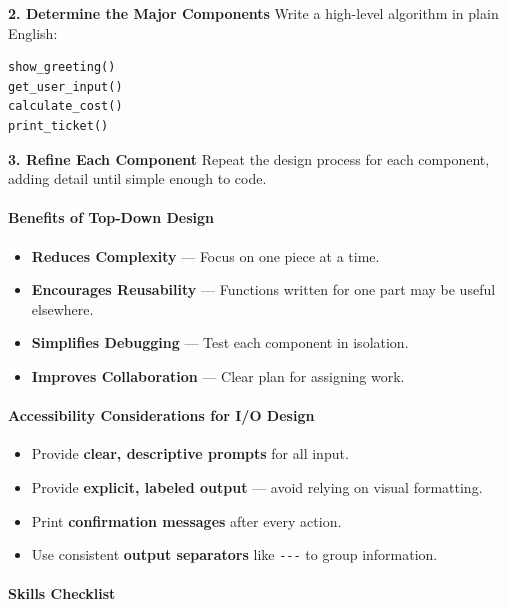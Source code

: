 \documentclass[
  justified,
  openright,
]{tufte-book}
\let\subsubsection\paragraph
\let\paragraph\paragraph
\let\subsubsection\paragraph
\let\paragraph\paragraph
\providecommand{\tightlist}{%
  \setlength{\itemsep}{0pt}\setlength{\parskip}{0pt}}
\begin{document}
\textbf{2. Determine the Major Components} Write a high-level algorithm
in plain English:

\begin{verbatim}
show_greeting()
get_user_input()
calculate_cost()
print_ticket()
\end{verbatim}

\textbf{3. Refine Each Component} Repeat the design process for each
component, adding detail until simple enough to code.

\subsubsection{Benefits of Top-Down
Design}\label{benefits-of-top-down-design}

\begin{itemize}
\tightlist
\item
  \textbf{Reduces Complexity} --- Focus on one piece at a time.
\item
  \textbf{Encourages Reusability} --- Functions written for one part may
  be useful elsewhere.
\item
  \textbf{Simplifies Debugging} --- Test each component in isolation.
\item
  \textbf{Improves Collaboration} --- Clear plan for assigning work.
\end{itemize}

\subsubsection{Accessibility Considerations for I/O
Design}\label{accessibility-considerations-for-io-design}

\begin{itemize}
\tightlist
\item
  Provide \textbf{clear, descriptive prompts} for all input.
\item
  Provide \textbf{explicit, labeled output} --- avoid relying on visual
  formatting.
\item
  Print \textbf{confirmation messages} after every action.
\item
  Use consistent \textbf{output separators} like \texttt{-\/-\/-} to
  group information.
\end{itemize}

\subsubsection{Skills Checklist}\label{skills-checklist-47}
\end{document}
